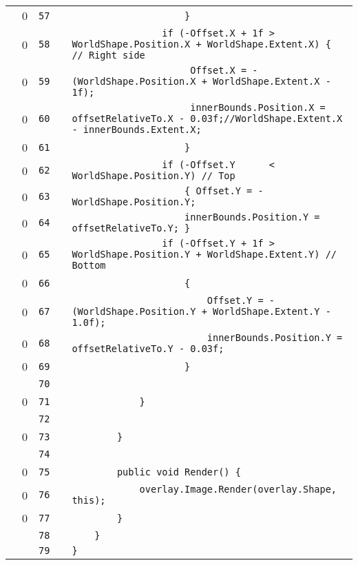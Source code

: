 \documentclass[a4paper,landscape,10pt]{article}
\begin{document}
\begin{longtable}[l]{lrrll}
\cellcolor{red} & 0 & \verb~57~ & & \verb~                    }~\\
\cellcolor{red} & 0 & \verb~58~ & & \verb~                if (-Offset.X + 1f > WorldShape.Position.X + WorldShape.Extent.X) { // Right side~\\
\cellcolor{red} & 0 & \verb~59~ & & \verb~                     Offset.X = -(WorldShape.Position.X + WorldShape.Extent.X - 1f);~\\
\cellcolor{red} & 0 & \verb~60~ & & \verb~                     innerBounds.Position.X = offsetRelativeTo.X - 0.03f;//WorldShape.Extent.X - innerBounds.Extent.X;~\\
\cellcolor{red} & 0 & \verb~61~ & & \verb~                    }~\\
\cellcolor{red} & 0 & \verb~62~ & & \verb~                if (-Offset.Y      < WorldShape.Position.Y) // Top~\\
\cellcolor{red} & 0 & \verb~63~ & & \verb~                    { Offset.Y = -WorldShape.Position.Y;~\\
\cellcolor{red} & 0 & \verb~64~ & & \verb~                    innerBounds.Position.Y = offsetRelativeTo.Y; }~\\
\cellcolor{red} & 0 & \verb~65~ & & \verb~                if (-Offset.Y + 1f > WorldShape.Position.Y + WorldShape.Extent.Y) // Bottom~\\
\cellcolor{red} & 0 & \verb~66~ & & \verb~                    {~\\
\cellcolor{red} & 0 & \verb~67~ & & \verb~                        Offset.Y = -(WorldShape.Position.Y + WorldShape.Extent.Y - 1.0f);~\\
\cellcolor{red} & 0 & \verb~68~ & & \verb~                        innerBounds.Position.Y = offsetRelativeTo.Y - 0.03f;~\\
\cellcolor{red} & 0 & \verb~69~ & & \verb~                    }~\\
\cellcolor{gray} &  & \verb~70~ & & \verb~~\\
\cellcolor{red} & 0 & \verb~71~ & & \verb~            }~\\
\cellcolor{gray} &  & \verb~72~ & & \verb~~\\
\cellcolor{red} & 0 & \verb~73~ & & \verb~        }~\\
\cellcolor{gray} &  & \verb~74~ & & \verb~~\\
\cellcolor{red} & 0 & \verb~75~ & & \verb~        public void Render() {~\\
\cellcolor{red} & 0 & \verb~76~ & & \verb~            overlay.Image.Render(overlay.Shape, this);~\\
\cellcolor{red} & 0 & \verb~77~ & & \verb~        }~\\
\cellcolor{gray} &  & \verb~78~ & & \verb~    }~\\
\cellcolor{gray} &  & \verb~79~ & & \verb~}~\\
\end{longtable}
\newpage
\end{document}
